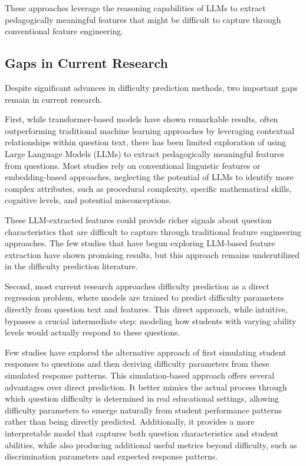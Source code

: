 \documentclass[
    a4paper, %
    10pt, %
    twoside, %
]{LTJournalArticle}
\begin{document}
These approaches leverage the reasoning capabilities of LLMs to extract pedagogically meaningful features that might be difficult to capture through conventional feature engineering.

\subsection{Gaps in Current Research}

Despite significant advances in difficulty prediction methods, two important gaps remain in current research.

First, while transformer-based models have shown remarkable results, often outperforming traditional machine learning approaches by leveraging contextual relationships within question text, there has been limited exploration of using Large Language Models (LLMs) to extract pedagogically meaningful features from questions. Most studies rely on conventional linguistic features or embedding-based approaches, neglecting the potential of LLMs to identify more complex attributes, such as procedural complexity, specific mathematical skills, cognitive levels, and potential misconceptions.

These LLM-extracted features could provide richer signals about question characteristics that are difficult to capture through traditional feature engineering approaches. The few studies that have begun exploring LLM-based feature extraction have shown promising results, but this approach remains underutilized in the difficulty prediction literature.

Second, most current research approaches difficulty prediction as a direct regression problem, where models are trained to predict difficulty parameters directly from question text and features. This direct approach, while intuitive, bypasses a crucial intermediate step: modeling how students with varying ability levels would actually respond to these questions.

Few studies have explored the alternative approach of first simulating student responses to questions and then deriving difficulty parameters from these simulated response patterns. This simulation-based approach offers several advantages over direct prediction. It better mimics the actual process through which question difficulty is determined in real educational settings, allowing difficulty parameters to emerge naturally from student performance patterns rather than being directly predicted. Additionally, it provides a more interpretable model that captures both question characteristics and student abilities, while also producing additional useful metrics beyond difficulty, such as discrimination parameters and expected response patterns.
\end{document}
